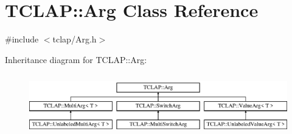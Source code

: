 \hypertarget{class_t_c_l_a_p_1_1_arg}{}\section{T\+C\+L\+A\+P\+:\+:Arg Class Reference}
\label{class_t_c_l_a_p_1_1_arg}


{\ttfamily \#include $<$tclap/\+Arg.\+h$>$}

Inheritance diagram for T\+C\+L\+A\+P\+:\+:Arg\+:\begin{figure}[H]
\begin{center}
\leavevmode
\includegraphics[height=2.705314cm]{class_t_c_l_a_p_1_1_arg}
\end{center}
\end{figure}
